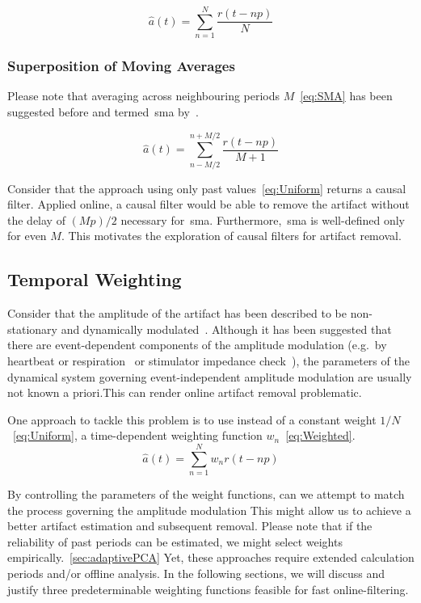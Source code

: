 \documentclass[a4paper]{article}
\begin{document}
\begin{equation}
    \hat{a}(t) = \sum_{n=1}^{N} \frac{r(t - np)}{N}\label{eq:Uniform}
\end{equation}

\subsubsection{Superposition of Moving Averages}

Please note that averaging across neighbouring periods $M$~\eqref{eq:SMA} has been suggested before and termed~\gls{sma} by~\cite{Kohli_2015}.

\begin{equation}
    \hat{a}(t) = \sum_{n-M/2}^{n+M/2} \frac{r(t - np)}{M+1}\label{eq:SMA}
\end{equation}

Consider that the approach using only past values~\eqref{eq:Uniform} returns a causal filter. Applied online, a causal filter would be able to remove the artifact without the delay of $(Mp)/2$ necessary for~\gls{sma}. Furthermore,~\gls{sma} is well-defined only for even $M$. This motivates the exploration of causal filters for artifact removal.

\subsection{Temporal Weighting}

Consider that the amplitude of the  artifact has been described to be non-stationary and dynamically modulated~\citep{Noury_2016,Neuling_2017}.
Although it has been suggested that there are event-dependent components of the amplitude modulation (e.g.\ by heartbeat or respiration~\cite{Noury_2016} or stimulator impedance check~\cite{Neuling_2017}), the parameters of the dynamical system governing event-independent amplitude modulation are usually not known a priori.This can render online artifact removal problematic.

One approach to tackle this problem is to use instead of a constant weight $1/N$~\eqref{eq:Uniform}, a time-dependent weighting function $w_n$~\eqref{eq:Weighted}.
\begin{equation}
    \hat{a}(t) = \sum_{n=1}^{N} w_n r(t - np)\label{eq:Weighted}
\end{equation}

By controlling the parameters of the weight functions, can we attempt to match the process governing the amplitude modulation
This might allow us to achieve a better artifact estimation and subsequent removal. Please note that if the reliability of past periods can be estimated, we might select weights empirically.~\ref{sec:adaptivePCA}
Yet, these approaches require extended calculation periods and/or offline analysis. In the following sections, we will discuss and justify three predeterminable weighting functions feasible for fast online-filtering.
\end{document}
